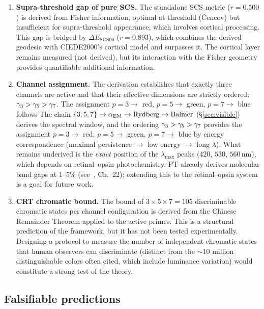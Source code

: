 \documentclass[12pt,a4paper]{article}
\begin{document}
\begin{enumerate}[nosep]
\item \textbf{Supra-threshold gap of pure SCS.} The standalone SCS
  metric ($r = 0.500$) is derived from Fisher information, optimal at
  threshold (\v{C}encov) but insufficient for supra-threshold
  appearance, which involves cortical processing. This gap is bridged
  by $\Delta E_{\mathrm{SCS00}}$ ($r = 0.893$), which combines the
  derived geodesic with CIEDE2000's cortical model and surpasses it.
  The cortical layer remains measured (not derived), but its
  interaction with the Fisher geometry provides quantifiable additional
  information.

\item \textbf{Channel assignment.} The derivation establishes that
  exactly three channels are active and that their effective dimensions
  are strictly ordered: $\gamma_{3} > \gamma_{5} > \gamma_{7}$. The
  assignment $p=3 \to$ red, $p=5 \to$ green, $p=7 \to$ blue follows
  The chain $\{3,5,7\} \to \alpha_{\mathrm{EM}} \to \mathrm{Rydberg} \to
  \mathrm{Balmer}$ (\S\ref{sec:visible}) derives the spectral window,
  and the ordering $\gamma_{3} > \gamma_{5} > \gamma_{7}$ provides the
  assignment $p=3 \to$ red, $p=5 \to$ green, $p=7 \to$ blue by energy
  correspondence (maximal persistence $\to$ low energy $\to$ long
  $\lambda$). What remains underived is the \emph{exact} position of
  the $\lambda_{\max}$ peaks ($420$, $530$, $560\,\mathrm{nm}$), which
  depends on retinal--opsin photochemistry. PT already derives molecular
  band gaps at 1--5\% (see~\cite{senez2026math}, Ch.~22); extending
  this to the retinal--opsin system is a goal for future work.

\item \textbf{CRT chromatic bound.} The bound of $3 \times 5 \times
  7 = 105$ discriminable chromatic states per channel configuration
  is derived from the Chinese Remainder Theorem applied to the active
  primes. This is a structural prediction of the framework, but it
  has not been tested experimentally. Designing a protocol to measure
  the number of independent chromatic states that human observers can
  discriminate (distinct from the $\sim\!10$ million distinguishable
  colors often cited, which include luminance variation) would
  constitute a strong test of the theory.
\end{enumerate}

\subsection{Falsifiable predictions}
\end{document}
